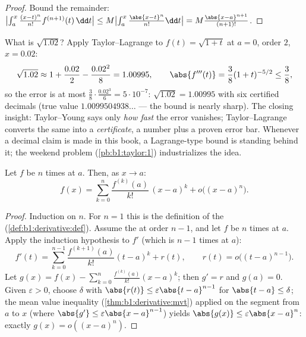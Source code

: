 \begin{proof}
Bound the  remainder: $\bigl|\int_a^x \frac{(x-t)^n}{n!}
f^{(n+1)}(t)\,\dd t\bigr| \leq M \bigl|\int_a^x
\frac{\abs{x-t}^n}{n!}\dd t\bigr| = M\frac{\abs{x-a}^{n+1}}{(n+1)!}$.
\end{proof}

\begin{example}\label{ex:b1:taylor:certified}
What is $\sqrt{1.02}$? Apply Taylor--Lagrange to $f(t) =
\sqrt{1 + t}$ at $a = 0$, order $2$, $x = 0.02$:
\[
\sqrt{1.02} \approx 1 + \frac{0.02}{2} - \frac{0.02^2}{8}
= 1.00995 ,
\qquad
\abs{f'''(t)} = \frac{3}{8}(1+t)^{-5/2} \leq \frac 38 ,
\]
so the error is at most $\frac38 \cdot \frac{0.02^3}{6} =
5\cdot10^{-7}$: $\sqrt{1.02} = 1.00995$ with six certified
decimals (true value $1.0099504938\dots$ --- the bound is nearly
sharp). The closing insight: Taylor--Young says only \emph{how
fast} the error vanishes; Taylor--Lagrange converts the same
 into a \emph{certificate}, a number plus a proven
error bar. Whenever a decimal claim is made in this book, a
Lagrange-type bound is standing behind it; the weekend problem
(\cref{pb:b1:taylor:1}) industrializes the idea.
\end{example}

\begin{theorem}\label{thm:b1:taylor:young}
Let $f$ be $n$ times  at $a$. Then, as $x \to a$:
\[
f(x) = \sum_{k=0}^{n} \frac{f^{(k)}(a)}{k!}\,(x-a)^k
+ o\bigl((x-a)^n\bigr) .
\]
\end{theorem}

\begin{proof}
Induction on $n$. For $n = 1$ this is the definition of the
 (\cref{def:b1:derivative:def}). Assume the  at
order $n - 1$, and let $f$ be $n$ times  at $a$. Apply
the induction hypothesis to $f'$ (which is $n-1$ times 
at $a$):
\[
f'(t) = \sum_{k=0}^{n-1} \frac{f^{(k+1)}(a)}{k!}(t-a)^k + r(t),
\qquad r(t) = o\bigl((t-a)^{n-1}\bigr).
\]
Let $g(x) = f(x) - \sum_{k=0}^{n} \frac{f^{(k)}(a)}{k!}(x-a)^k$; then
$g' = r$ and $g(a) = 0$. Given $\varepsilon > 0$, choose $\delta$
with $\abs{r(t)} \leq \varepsilon\abs{t - a}^{n-1}$ for $\abs{t-a}
\leq \delta$; the mean value inequality
(\cref{thm:b1:derivative:mvt}) applied on the segment from $a$ to
$x$ (where $\abs{g'} \leq \varepsilon\abs{x-a}^{n-1}$) yields
$\abs{g(x)} \leq \varepsilon\abs{x - a}^n$: exactly $g(x) =
o((x-a)^n)$.
\end{proof}

